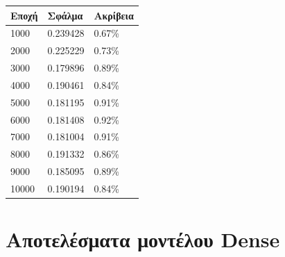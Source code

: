 \begin{center}
\begin{tabular}{|l|l|l|}
\hline
\textbf{Εποχή} & \textbf{Σφάλμα} & \textbf{Ακρίβεια} \\ \hline
1000		   & 0.239428        & 0.67\%            \\ \hline
2000		   & 0.225229        & 0.73\%            \\ \hline
3000		   & 0.179896        & 0.89\%            \\ \hline
4000		   & 0.190461        & 0.84\%            \\ \hline
5000		   & 0.181195        & 0.91\%            \\ \hline
6000		   & 0.181408        & 0.92\%            \\ \hline
7000		   & 0.181004        & 0.91\%            \\ \hline
8000		   & 0.191332        & 0.86\%            \\ \hline
9000		   & 0.185095        & 0.89\%            \\ \hline
10000		   & 0.190194        & 0.84\%            \\ \hline
\end{tabular}
\end{center}
 \label{tab:title}

\section{Αποτελέσματα μοντέλου Dense}

